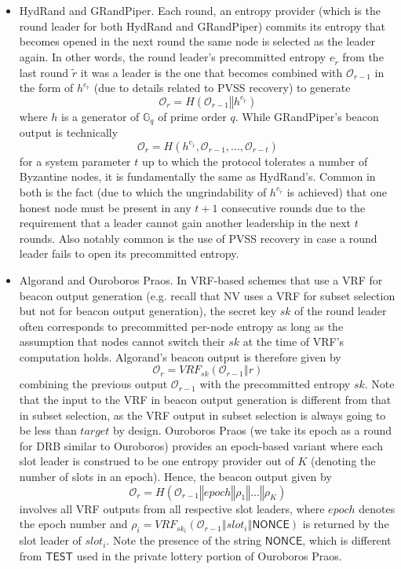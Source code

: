 \documentclass[letterpaper,twocolumn,10pt]{article}
\theoremstyle{definition}
\theoremstyle{remark}
\begin{document}
\begin{itemize}
\item HydRand and GRandPiper. Each round, an entropy provider (which is the round leader for both HydRand and GRandPiper) commits its entropy that becomes opened in the next round the same node is selected as the leader again. In other words, the round leader's precommitted entropy $e_{\tilde{r}}$ from the last round $\tilde{r}$ it was a leader is the one that becomes combined with $\mathcal{O}_{r - 1}$ in the form of $h^{e_{\tilde{r}}}$ (due to details related to PVSS recovery) to generate
\[
\mathcal{O}_r = H(\mathcal{O}_{r - 1} \mathbin\Vert h^{e_{\tilde{r}}})
\]
where $h$ is a generator of $\mathbb{G}_q$ of prime order $q$. While GRandPiper's beacon output is technically
\[
\mathcal{O}_r = H(h^{e_{\tilde{r}}}, \mathcal{O}_{r - 1}, ..., \mathcal{O}_{r - t})
\]
for a system parameter $t$ up to which the protocol tolerates a number of Byzantine nodes, it is fundamentally the same as HydRand's. Common in both is the fact (due to which the ungrindability of $h^{e_{\tilde{r}}}$ is achieved) that one honest node must be present in any $t + 1$ consecutive rounds due to the requirement that a leader cannot gain another leadership in the next $t$ rounds. Also notably common is the use of PVSS recovery in case a round leader fails to open its precommitted entropy.
\item Algorand and Ouroboros Praos. In VRF-based schemes that use a VRF for beacon output generation (e.g. recall that NV uses a VRF for subset selection but not for beacon output generation), the secret key $sk$ of the round leader often corresponds to precommitted per-node entropy as long as the assumption that nodes cannot switch their $sk$ at the time of VRF's computation holds. Algorand's beacon output is therefore given by
\[
\mathcal{O}_r = VRF_{sk}(\mathcal{O}_{r - 1} \mathbin\Vert r)
\]
combining the previous output $\mathcal{O}_{r - 1}$ with the precommitted entropy $sk$. Note that the input to the VRF in beacon output generation is different from that in subset selection, as the VRF output in subset selection is always going to be less than $target$ by design. Ouroboros Praos (we take its epoch as a round for DRB similar to Ouroboros) provides an epoch-based variant where each slot leader is construed to be one entropy provider out of $K$ (denoting the number of slots in an epoch). Hence, the beacon output given by
\[
\mathcal{O}_r = H(\mathcal{O}_{r - 1} \mathbin\Vert epoch \mathbin\Vert \rho_1 \mathbin\Vert ... \mathbin\Vert \rho_K)
\]
involves all VRF outputs from all respective slot leaders, where $epoch$ denotes the epoch number and $\rho_i = VRF_{sk_i}(\mathcal{O}_{r - 1} \mathbin\Vert slot_i \mathbin\Vert \mathsf{NONCE})$ is returned by the slot leader of $slot_i$. Note the presence of the string $\mathsf{NONCE}$, which is different from $\mathsf{TEST}$ used in the private lottery portion of Ouroboros Praos.

\end{itemize}
\end{document}
